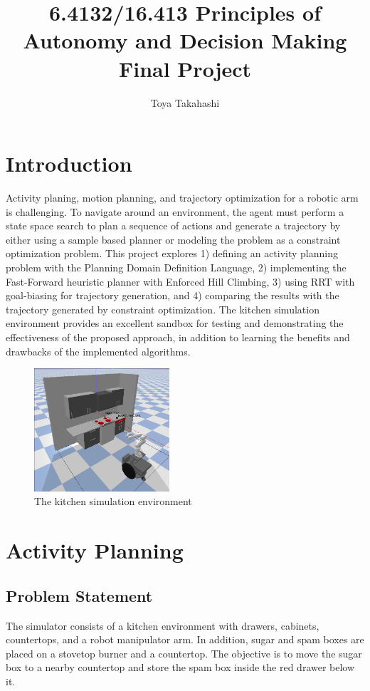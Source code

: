 \documentclass{article}
\title{6.4132/16.413 Principles of Autonomy and Decision Making Final Project}
\author[ ]{Toya Takahashi}
\affil[ ]{Massachusetts Institute of Technology}
\affil[ ]{Department of Aeronautics and Astronautics}
\begin{document}
\maketitle

\section{Introduction}

Activity planing, motion planning, and trajectory optimization for a robotic arm is challenging. To navigate around an environment, the agent must perform a state space search to plan a sequence of actions and generate a trajectory by either using a sample based planner or modeling the problem as a constraint optimization problem. This project explores 1) defining an activity planning problem with the Planning Domain Definition Language, 2) implementing the Fast-Forward heuristic planner with Enforced Hill Climbing, 3) using RRT with goal-biasing for trajectory generation, and 4) comparing the results with the trajectory generated by constraint optimization. The kitchen simulation environment provides an excellent sandbox for testing and demonstrating the effectiveness of the proposed approach, in addition to learning the benefits and drawbacks of the implemented algorithms.

\begin{figure}[h]
    \centering
    \includegraphics[width=190px]{sim_env.jpg}
    \caption{The kitchen simulation environment}
    \label{fig:sim_env}
\end{figure}

\section{Activity Planning}

\iffalse
\subsection{Problem Statement}

The simulator consists of a kitchen environment with drawers, cabinets, countertops, and a robot manipulator arm. In addition, sugar and spam boxes are placed on a stovetop burner and a countertop. The objective is to move the sugar box to a nearby countertop and store the spam box inside the red drawer below it.
\end{document}
